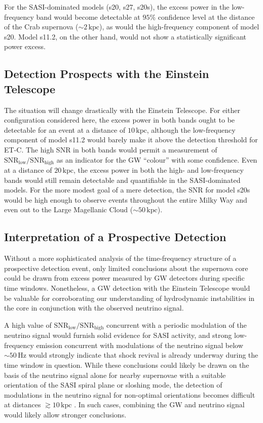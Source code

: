 For the SASI-dominated models (s20, s27, s20s), the excess
power in the low-frequency band would become detectable
at $95 \%$ confidence level at the distance of the Crab supernova
($\mathord{\sim} 2 \, \mathrm{kpc}$), as would the high-frequency
component of model s20. Model s11.2, on the other hand, would not
show a statistically significant
power excess. 

\subsection{Detection Prospects with the Einstein Telescope}
The situation will change drastically with the Einstein Telescope.  For
either configuration considered here, the excess power in both bands
ought to be detectable for an event at a distance of $10
\, \mathrm{kpc}$, although the low-frequency component of model s11.2
would barely make it above the detection threshold
for ET-C. The high SNR in both bands would permit
a measurement of $\mathrm{SNR}_\mathrm{low}/\mathrm{SNR}_\mathrm{high}$
as an indicator for the GW ``colour'' with some confidence.
Even at a distance of $20 \, \mathrm{kpc}$, the excess power in
both the high- and low-frequency bands would still remain detectable
and quantifiable in the SASI-dominated models.
For the more modest goal of a mere detection, the SNR for
model s20s would be high enough to observe events throughout
the entire Milky Way and even out to the Large Magellanic
Cloud ($\mathord{\sim} 50 \, \mathrm{kpc}$).

\subsection{Interpretation of a Prospective Detection}
Without a more sophisticated analysis of the time-frequency
structure of a prospective detection event, only limited conclusions
about the supernova core could be drawn from excess power
measured by GW detectors during specific time windows. Nonetheless, a GW
detection with the Einstein Telescope would be valuable for corroborating
our understanding of hydrodynamic instabilities in the core
in conjunction with the observed neutrino signal.

A high value of
$\mathrm{SNR}_\mathrm{low}/\mathrm{SNR}_\mathrm{high}$ concurrent
with a periodic modulation of the neutrino signal
\citep{marek_08,lund_10,brandt_11,tamborra_13, mueller_14,tamborra_14b} would
furnish solid evidence for SASI activity, and strong
low-frequency emission concurrent with modulations of the
neutrino signal below $\mathord{\sim} 50 \, \mathrm{Hz}$ would strongly
indicate that shock revival is already underway during the
time window in question. While these conclusions could likely
be drawn on the basis of the neutrino signal alone for nearby
supernovae with a suitable orientation of the SASI spiral
plane or sloshing mode, the detection of modulations
in the neutrino signal for non-optimal orientations becomes
difficult at
distances $\gtrsim 10 \, \mathrm{kpc}$
\citep{mueller_14}. In such cases, combining the GW and neutrino
signal would likely allow stronger conclusions.

